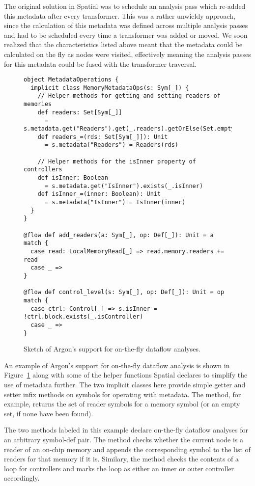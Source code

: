 The original solution in Spatial was to schedule an analysis pass which
re-added this metadata after every transformer. This was a rather unwieldy approach,
since the calculation of this metadata was defined across multiple analysis
passes and had to be scheduled every time a transformer was added or moved.
We soon realized that the characteristics listed above meant that the
metadata could be calculated on the fly as nodes were visited, effectively meaning
the analysis passes for this metadata could be fused with the transformer traversal.


\begin{figure}
\begin{lstlisting}[language=ScalaDSL]
object MetadataOperations {
  implicit class MemoryMetadataOps(s: Sym[_]) {
    // Helper methods for getting and setting readers of memories
    def readers: Set[Sym[_]]
      = s.metadata.get("Readers").get(_.readers).getOrElse(Set.empty)
    def readers_=(rds: Set[Sym[_]]): Unit
      = s.metadata("Readers") = Readers(rds)

    // Helper methods for the isInner property of controllers
    def isInner: Boolean
      = s.metadata.get("IsInner").exists(_.isInner)
    def isInner_=(inner: Boolean): Unit
      = s.metadata("IsInner") = IsInner(inner)
  }
}

@flow def add_readers(a: Sym[_], op: Def[_]): Unit = a match {
  case read: LocalMemoryRead[_] => read.memory.readers += read
  case _ =>
}

@flow def control_level(s: Sym[_], op: Def[_]): Unit = op match {
  case ctrl: Control[_] => s.isInner = !ctrl.block.exists(_.isController)
  case _ =>
}
\end{lstlisting}
\caption{Sketch of Argon's support for on-the-fly dataflow analyses.}
\label{fig:argon-flows}
\end{figure}

An example of Argon's support for on-the-fly dataflow analysis is shown in
Figure~\ref{fig:argon-flows} along with some of the helper functions Spatial
declares to simplify the use of metadata further. The two implicit classes
here provide simple getter and setter infix methods on symbols for operating
with metadata. The  method, for example, returns the set of
reader symbols for a memory symbol (or an empty set, if none have been found).

The two methods labeled  in this example declare on-the-fly dataflow
analyses for an arbitrary symbol-def pair.
The  method checks whether the current node is a reader of an
on-chip memory and appends the corresponding symbol to the list of readers for
that memory if it is. Similary, the  method checks the
contents of a loop for controllers and marks the loop as either an inner or
outer controller accordingly.

